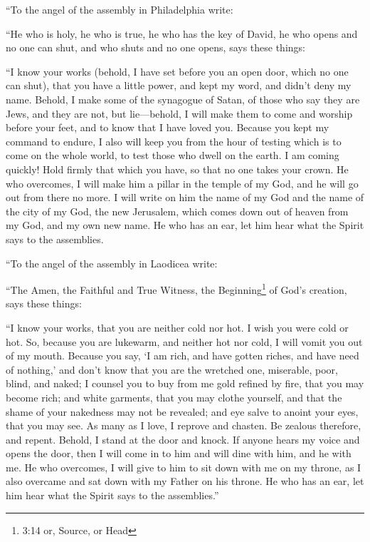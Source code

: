  ``To the angel of the assembly in Philadelphia write:

``He who is holy, he who is true, he who has the key of David, he who
opens and no one can shut, and who shuts and no one opens, says these
things:

 ``I know your works (behold, I have set before you an open
door, which no one can shut), that you have a little power, and kept my
word, and didn't deny my name.  Behold, I make some of the
synagogue of Satan, of those who say they are Jews, and they are not,
but lie---behold, I will make them to come and worship before your feet,
and to know that I have loved you.  Because you kept my
command to endure, I also will keep you from the hour of testing which
is to come on the whole world, to test those who dwell on the earth.
 I am coming quickly! Hold firmly that which you have, so
that no one takes your crown.  He who overcomes, I will
make him a pillar in the temple of my God, and he will go out from there
no more. I will write on him the name of my God and the name of the city
of my God, the new Jerusalem, which comes down out of heaven from my
God, and my own new name.  He who has an ear, let him hear
what the Spirit says to the assemblies.

 ``To the angel of the assembly in Laodicea write:

``The Amen, the Faithful and True Witness, the Beginning\footnote{3:14
  or, Source, or Head} of God's creation, says these things:

 ``I know your works, that you are neither cold nor hot. I
wish you were cold or hot.  So, because you are lukewarm,
and neither hot nor cold, I will vomit you out of my mouth.
 Because you say, `I am rich, and have gotten riches, and
have need of nothing,' and don't know that you are the wretched one,
miserable, poor, blind, and naked;  I counsel you to buy
from me gold refined by fire, that you may become rich; and white
garments, that you may clothe yourself, and that the shame of your
nakedness may not be revealed; and eye salve to anoint your eyes, that
you may see.  As many as I love, I reprove and chasten. Be
zealous therefore, and repent.  Behold, I stand at the door
and knock. If anyone hears my voice and opens the door, then I will come
in to him and will dine with him, and he with me.  He who
overcomes, I will give to him to sit down with me on my throne, as I
also overcame and sat down with my Father on his throne. 
He who has an ear, let him hear what the Spirit says to the
assemblies.''

